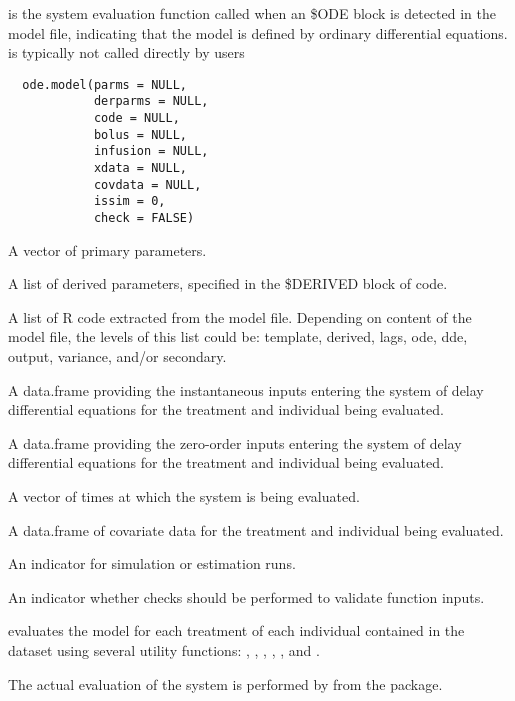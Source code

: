 %
\begin{Description}\relax
{} is the system evaluation function called when an \$ODE block
is detected in the model file, indicating that the model is defined by 
ordinary differential equations.  is typically not called 
directly by users
\end{Description}
%
\begin{Usage}
\begin{verbatim}
  ode.model(parms = NULL,
            derparms = NULL,
            code = NULL,
            bolus = NULL,
            infusion = NULL,
            xdata = NULL,
            covdata = NULL,
            issim = 0,
            check = FALSE)
\end{verbatim}
\end{Usage}
%
\begin{Arguments}
\begin{ldescription}
\item[\code{parms}] A vector of primary parameters.
\item[\code{derparms}] A list of derived parameters, specified in the \$DERIVED block
of code.
\item[\code{code}] A list of R code extracted from the model file. Depending on 
content of the model file, the levels of this list could be: template,
derived, lags, ode, dde, output, variance, and/or secondary.
\item[\code{bolus}] A data.frame providing the instantaneous inputs  entering the 
system of delay differential equations for the treatment and individual 
being evaluated.
\item[\code{infusion}] A data.frame providing the zero-order inputs entering the 
system of delay differential equations for the treatment and individual 
being evaluated.
\item[\code{xdata}] A vector of times at which the system is being evaluated.
\item[\code{covdata}] A data.frame of covariate data for the treatment and individual 
being evaluated.
\item[\code{issim}] An indicator for simulation or estimation runs.
\item[\code{check}] An indicator whether checks should be performed to validate 
function inputs.
\end{ldescription}
\end{Arguments}
%
\begin{Details}\relax
{} evaluates the model for each treatment of each individual 
contained in the dataset using several utility functions: ,
, , , ,
and .

The actual evaluation of the system is performed by  from the 
 package.
\end{Details}
